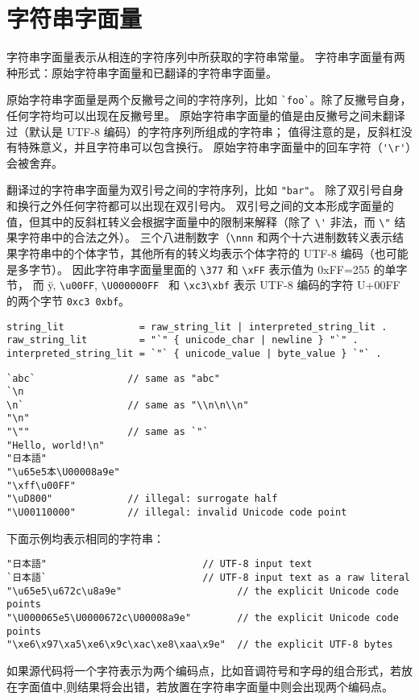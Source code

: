 
\section{字符串字面量}
字符串字面量表示从相连的字符序列中所获取的字符串常量。
字符串字面量有两种形式：原始字符串字面量和已翻译的字符串字面量。

原始字符串字面量是两个反撇号之间的字符序列，比如 \lstinline|`foo`|。除了反撇号自身，任何字符均可以出现在反撇号里。
原始字符串字面量的值是由反撇号之间未翻译过（默认是 UTF-8 编码）的字符序列所组成的字符串；
值得注意的是，反斜杠没有特殊意义，并且字符串可以包含换行。
原始字符串字面量中的回车字符（\lstinline|'\r'|）会被舍弃。

翻译过的字符串字面量为双引号之间的字符序列，比如 \lstinline|"bar"|。
除了双引号自身和换行之外任何字符都可以出现在双引号内。
双引号之间的文本形成字面量的值，但其中的反斜杠转义会根据\rune{}字面量中的限制来解释（除了 \lstinline|\'| 非法，而 \lstinline|\"| 结果字符串中的合法之外）。
三个八进制数字（\lstinline|\nnn| 和两个十六进制数转义表示结果字符串中的个体字节，其他所有的转义均表示个体字符的 UTF-8 编码（也可能是多字节）。
因此字符串字面量里面的 \lstinline|\377| 和 \lstinline|\xFF| 表示值为 0xFF=255 的单字节，
而 \"y, \lstinline|\u00FF|, \lstinline|\U000000FF | 和 \lstinline|\xc3\xbf| 表示 UTF-8 编码的字符 U+00FF 的两个字节 \lstinline|0xc3 0xbf|。

\begin{lstlisting}[style=EBNF]
string_lit             = raw_string_lit | interpreted_string_lit .
raw_string_lit         = "`" { unicode_char | newline } "`" .
interpreted_string_lit = `"` { unicode_value | byte_value } `"` .
\end{lstlisting}

\begin{lstlisting}[style=golang]
`abc`                // same as "abc"
`\n
\n`					 // same as "\\n\n\\n"
"\n"
"\""                 // same as `"`
"Hello, world!\n"
"日本語"
"\u65e5本\U00008a9e"
"\xff\u00FF"
"\uD800"             // illegal: surrogate half
"\U00110000"         // illegal: invalid Unicode code point
\end{lstlisting}
下面示例均表示相同的字符串：
\begin{lstlisting}[style=golang]
"日本語"							// UTF-8 input text
`日本語`							// UTF-8 input text as a raw literal
"\u65e5\u672c\u8a9e"                    // the explicit Unicode code points
"\U000065e5\U0000672c\U00008a9e"        // the explicit Unicode code points
"\xe6\x97\xa5\xe6\x9c\xac\xe8\xaa\x9e"  // the explicit UTF-8 bytes
\end{lstlisting}
如果源代码将一个字符表示为两个编码点，比如音调符号和字母的组合形式，若放在\rune{}字面值中,则结果将会出错，若放置在字符串字面量中则会出现两个编码点。
